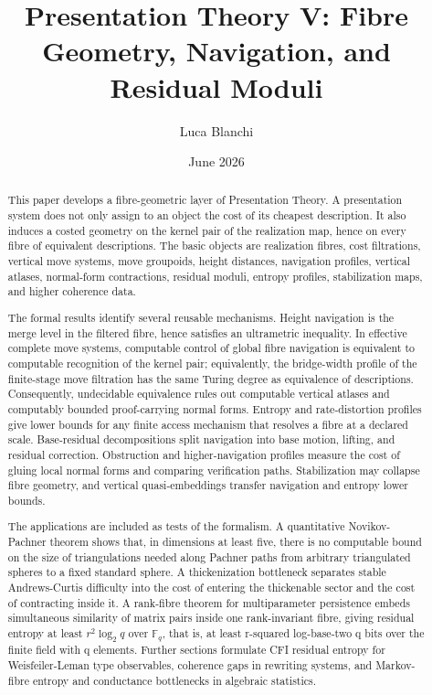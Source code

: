 \documentclass[11pt]{article}
\title{Presentation Theory V: Fibre Geometry, Navigation, and Residual Moduli}
\author{Luca Blanchi}
\date{June 2026}
\begin{document}
\maketitle

\begin{abstract}
This paper develops a fibre-geometric layer of Presentation Theory.  A presentation system does not only assign to an object the cost of its cheapest description.  It also induces a costed geometry on the kernel pair of the realization map, hence on every fibre of equivalent descriptions.  The basic objects are realization fibres, cost filtrations, vertical move systems, move groupoids, height distances, navigation profiles, vertical atlases, normal-form contractions, residual moduli, entropy profiles, stabilization maps, and higher coherence data.

The formal results identify several reusable mechanisms.  Height navigation is the merge level in the filtered fibre, hence satisfies an ultrametric inequality.  In effective complete move systems, computable control of global fibre navigation is equivalent to computable recognition of the kernel pair; equivalently, the bridge-width profile of the finite-stage move filtration has the same Turing degree as equivalence of descriptions.  Consequently, undecidable equivalence rules out computable vertical atlases and computably bounded proof-carrying normal forms.  Entropy and rate-distortion profiles give lower bounds for any finite access mechanism that resolves a fibre at a declared scale.  Base-residual decompositions split navigation into base motion, lifting, and residual correction.  Obstruction and higher-navigation profiles measure the cost of gluing local normal forms and comparing verification paths.  Stabilization may collapse fibre geometry, and vertical quasi-embeddings transfer navigation and entropy lower bounds.

The applications are included as tests of the formalism.  A quantitative Novikov-Pachner theorem shows that, in dimensions at least five, there is no computable bound on the size of triangulations needed along Pachner paths from arbitrary triangulated spheres to a fixed standard sphere.  A thickenization bottleneck separates stable Andrews-Curtis difficulty into the cost of entering the thickenable sector and the cost of contracting inside it.  A rank-fibre theorem for multiparameter persistence embeds simultaneous similarity of matrix pairs inside one rank-invariant fibre, giving residual entropy at least \(r^2\log_2 q\) over \(\mathbb F_q\), that is, at least r-squared log-base-two q bits over the finite field with q elements.  Further sections formulate CFI residual entropy for Weisfeiler-Leman type observables, coherence gaps in rewriting systems, and Markov-fibre entropy and conductance bottlenecks in algebraic statistics.
\end{abstract}
\end{document}
